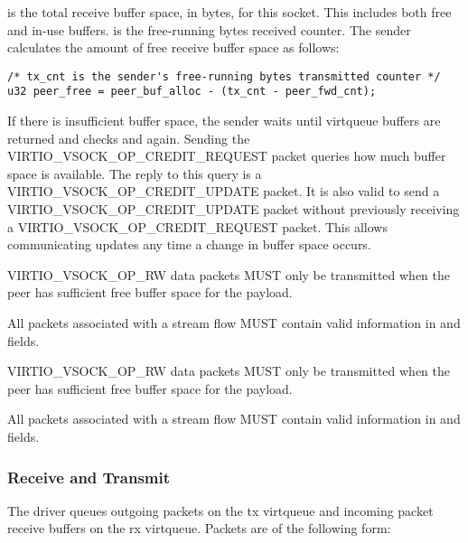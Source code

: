  is the total receive buffer space, in bytes, for this socket.
This includes both free and in-use buffers.  is the free-running
bytes received counter. The sender calculates the amount of free receive buffer
space as follows:

\begin{lstlisting}
/* tx_cnt is the sender's free-running bytes transmitted counter */
u32 peer_free = peer_buf_alloc - (tx_cnt - peer_fwd_cnt);
\end{lstlisting}

If there is insufficient buffer space, the sender waits until virtqueue buffers
are returned and checks  and  again. Sending
the VIRTIO_VSOCK_OP_CREDIT_REQUEST packet queries how much buffer space is
available. The reply to this query is a VIRTIO_VSOCK_OP_CREDIT_UPDATE packet.
It is also valid to send a VIRTIO_VSOCK_OP_CREDIT_UPDATE packet without
previously receiving a VIRTIO_VSOCK_OP_CREDIT_REQUEST packet. This allows
communicating updates any time a change in buffer space occurs.

VIRTIO_VSOCK_OP_RW data packets MUST only be transmitted when the peer has
sufficient free buffer space for the payload.

All packets associated with a stream flow MUST contain valid information in
 and  fields.

VIRTIO_VSOCK_OP_RW data packets MUST only be transmitted when the peer has
sufficient free buffer space for the payload.

All packets associated with a stream flow MUST contain valid information in
 and  fields.

\subsubsection{Receive and Transmit}\label{sec:Device Types / Socket Device / Device Operation / Receive and Transmit}
The driver queues outgoing packets on the tx virtqueue and incoming packet
receive buffers on the rx virtqueue. Packets are of the following form:

